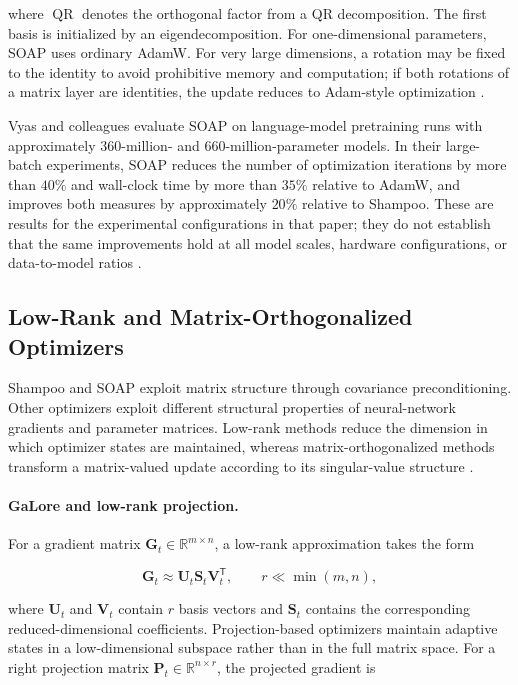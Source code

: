 where $\operatorname{QR}$ denotes the orthogonal factor from a QR
decomposition. The first basis is initialized by an eigendecomposition.
For one-dimensional parameters, SOAP uses ordinary AdamW. For very
large dimensions, a rotation may be fixed to the identity to avoid
prohibitive memory and computation; if both rotations of a matrix
layer are identities, the update reduces to Adam-style optimization
\parencite{Vyas2025SOAP}.

Vyas and colleagues evaluate SOAP on language-model pretraining runs
with approximately $360$-million- and $660$-million-parameter models.
In their large-batch experiments, SOAP reduces the number of
optimization iterations by more than $40\%$ and wall-clock time by
more than $35\%$ relative to AdamW, and improves both measures by
approximately $20\%$ relative to Shampoo. These are results for the
experimental configurations in that paper; they do not establish
that the same improvements hold at all model scales, hardware
configurations, or data-to-model ratios
\parencite{Vyas2025SOAP}.

\subsection{Low-Rank and Matrix-Orthogonalized Optimizers}
\label{subsec:optimization-low-rank-matrix}

Shampoo and SOAP exploit matrix structure through covariance
preconditioning. Other optimizers exploit different structural
properties of neural-network gradients and parameter matrices.
Low-rank methods reduce the dimension in which optimizer states are
maintained, whereas matrix-orthogonalized methods transform a
matrix-valued update according to its singular-value structure
\parencite{Ranganath2026Navigating}.

\paragraph{GaLore and low-rank projection.}
For a gradient matrix
$\mathbf{G}_t\in\mathbb{R}^{m\times n}$, a low-rank approximation
takes the form

\begin{equation}
    \mathbf{G}_t
    \approx
    \mathbf{U}_t\mathbf{S}_t\mathbf{V}_t^{\mathsf{T}},
    \qquad
    r\ll\min(m,n),
    \label{eq:opt-low-rank-svd}
\end{equation}

where $\mathbf{U}_t$ and $\mathbf{V}_t$ contain $r$ basis vectors
and $\mathbf{S}_t$ contains the corresponding reduced-dimensional
coefficients. Projection-based optimizers maintain adaptive states
in a low-dimensional subspace rather than in the full matrix space.
For a right projection matrix
$\mathbf{P}_t\in\mathbb{R}^{n\times r}$, the projected gradient is

